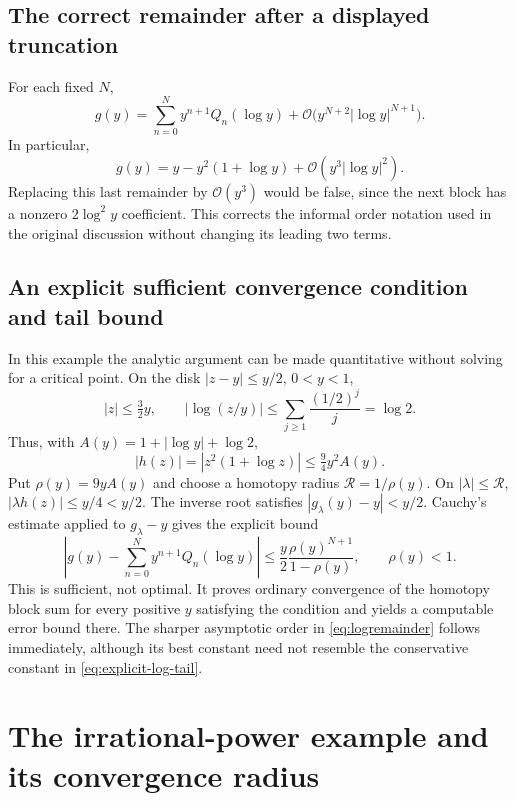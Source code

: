 \documentclass[11pt,a4paper]{article}
\theoremstyle{definition}
\theoremstyle{remark}
\newcommand{\OO}{\mathcal O}
\begin{document}
\subsection{The correct remainder after a displayed truncation}

For each fixed $N$,
\begin{equation}\label{eq:logremainder}
 g(y)=\sum_{n=0}^{N}y^{n+1}Q_n(\log y)
      +\OO\bigl(y^{N+2}|\log y|^{N+1}\bigr).
\end{equation}
In particular,
\[
 g(y)=y-y^2(1+\log y)+\OO(y^3|\log y|^2).
\]
Replacing this last remainder by $\OO(y^3)$ would be false, since the next
block has a nonzero $2\log^2y$ coefficient. This corrects the informal order
notation used in the original discussion without changing its leading two
terms.

\subsection{An explicit sufficient convergence condition and tail bound}

In this example the analytic argument can be made quantitative without solving
for a critical point. On the disk $|z-y|\le y/2$, $0<y<1$,
\[
 |z|\le\tfrac32y,\qquad
 |\log(z/y)|\le\sum_{j\ge1}\frac{(1/2)^j}{j}=\log2.
\]
Thus, with $A(y)=1+|\log y|+\log2$,
\[
 |h(z)|=|z^2(1+\log z)|\le\tfrac94 y^2A(y).
\]
Put $\rho(y)=9yA(y)$ and choose a homotopy radius
$\mathcal R=1/\rho(y)$. On $|\lambda|\le\mathcal R$,
$|\lambda h(z)|\le y/4<y/2$. The inverse root satisfies
$|g_\lambda(y)-y|<y/2$. Cauchy's estimate applied to $g_\lambda-y$ gives the
explicit bound
\begin{equation}\label{eq:explicit-log-tail}
 \boxed{\displaystyle
 \left|g(y)-\sum_{n=0}^{N}y^{n+1}Q_n(\log y)\right|
 \le\frac y2\frac{\rho(y)^{N+1}}{1-\rho(y)},\qquad \rho(y)<1.}
\end{equation}
This is sufficient, not optimal. It proves ordinary convergence of the
homotopy block sum for every positive $y$ satisfying the condition and yields
a computable error bound there. The sharper asymptotic order in
\eqref{eq:logremainder} follows immediately, although its best constant need
not resemble the conservative constant in \eqref{eq:explicit-log-tail}.

\section{The irrational-power example and its convergence radius}
\label{sec:powerexample}
\end{document}
